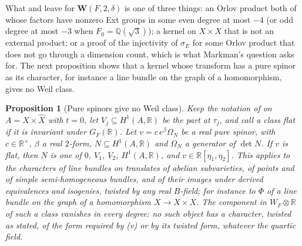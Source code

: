 \documentclass[11pt,reqno]{amsart}
\theoremstyle{plain}
\newtheorem{proposition}[theorem]{Proposition}
\theoremstyle{definition}
\theoremstyle{remark}
\newcommand{\QQ}{\mathbb{Q}}
\newcommand{\RR}{\mathbb{R}}
\begin{document}
What  and  leave for
$\mathbf{W}(F,2,\delta)$ is one of three things: an Orlov product both of
whose factors have nonzero Ext groups in some even degree at most $-4$ (or odd
degree at most $-3$ when $F_{0}=\QQ(\sqrt3)$); a kernel on $X\times X$ that is
not an external product; or a proof of the injectivity of $\sigma_{E}$ for
some Orlov product that does not go through a dimension count, which is what
Markman's question \cite[Question~11.2.2]{Mar25c} asks for. The next
proposition shows that a kernel whose transform has a pure spinor as its
character, for instance a line bundle on the graph of a homomorphism, gives no
Weil class.

\begin{proposition}[Pure spinors give no Weil class]
\label{prop:quarticexclusions}
Keep the notation of  on $A=X\times\widehat X$
with $t=0$, let $V_{j}\subseteq H^{1}(A,\RR)$ be the part at $\tau_{j}$, and
call a class flat if it is invariant under $G_{F}(\RR)$. Let
$v=c\,e^{\beta}\Omega_{N}$ be a real pure spinor, with $c\in\RR^{\times}$,
$\beta$ a real $2$-form, $N\subseteq H^{1}(A,\RR)$ and $\Omega_{N}$ a
generator of $\det N$. If $v$ is flat, then $N$ is one of $0$, $V_{1}$,
$V_{2}$, $H^{1}(A,\RR)$, and $v\in\RR[\eta_{1},\eta_{2}]$. This applies to
the characters of line bundles on translates of abelian subvarieties, of
points and of simple semi-homogeneous bundles, and of their images under
derived equivalences and isogenies, twisted by any real $B$-field; for
instance to $\Phi$ of a line bundle on the graph of a homomorphism $X\to
X\times X$. The component in $W_{F}\otimes\RR$ of such a class vanishes in
every degree: no such object has a character, twisted as stated, of the form
required by (v) or by its twisted form, whatever
the quartic field.
\end{proposition}
\end{document}
